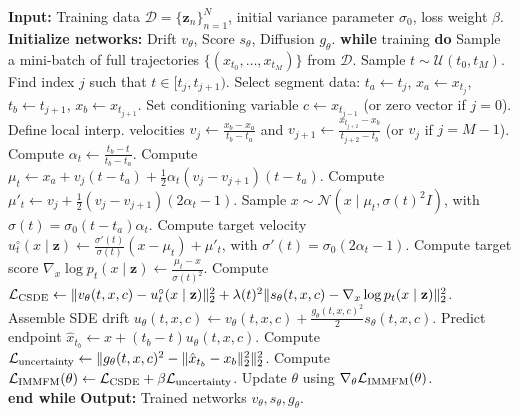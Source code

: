 \documentclass[twoside]{article}
\begin{document}
\begin{algorithm}[h]
\caption{IMMFM Training}
\label{alg:immfm_training}
\begin{algorithmic}[1]
\State \textbf{Input:} Training data $\mathcal{D} = \{ \mathbf{z}_n \}_{n=1}^N$, initial variance parameter $\sigma_0$, loss weight $\beta$.
\State \textbf{Initialize networks:} Drift $v_{\theta}$, Score $s_{\theta}$, Diffusion $g_{\theta}$.
\State \textbf{while} training \textbf{do}
\State Sample a mini-batch of full trajectories $\{ (x_{t_0}, \ldots, x_{t_M}) \}$ from $\mathcal{D}$.
\State Sample $t \sim \mathcal{U}(t_0, t_M)$.
\State Find index $j$ such that $t \in [t_j, t_{j+1})$.
\State Select segment data: $t_a \leftarrow t_j$, $x_a \leftarrow x_{t_j}$, $t_b \leftarrow t_{j+1}$, $x_b \leftarrow x_{t_{j+1}}$.
\State Set conditioning variable $c \leftarrow x_{t_{j-1}}$ (or zero vector if $j=0$).
\State Define local interp. velocities $v_j \leftarrow \frac{x_b - x_a}{t_b - t_a}$ and $v_{j+1} \leftarrow \frac{x_{t_{j+2}} - x_b}{t_{j+2} - t_b}$ (or $v_j$ if $j=M-1$).
\State Compute $\alpha_t \leftarrow \frac{t_b - t}{t_b - t_a}$.
\State Compute $\mu_t \leftarrow x_a + v_j (t - t_a) + \frac{1}{2}\alpha_t (v_j - v_{j+1})(t - t_a)$.
\State Compute $\mu'_t \leftarrow v_j + \frac{1}{2}(v_j - v_{j+1})(2\alpha_t - 1)$.
\State Sample $x \sim \mathcal{N}(x \mid \mu_t, \sigma(t)^2 I)$, with $\sigma(t) = \sigma_0 (t-t_a)\alpha_t$.
\State Compute target velocity $u^\circ_t(x \mid \mathbf{z}) \leftarrow \frac{\sigma'(t)}{\sigma(t)}(x - \mu_t) + \mu'_t$, with $\sigma'(t) = \sigma_0(2\alpha_t-1)$.
\State Compute target score $\nabla_x \log p_t(x \mid \mathbf{z}) \leftarrow \frac{\mu_t - x}{\sigma(t)^2}$.
\State Compute $\mathcal{L}_{\rm CSDE} \leftarrow \| v_{\theta}(t,x,c) - u^\circ_t(x \mid \mathbf{z}) \|_2^2 + \lambda(t)^2 \| s_{\theta}(t,x,c) - \nabla_x \log p_t(x \mid \mathbf{z}) \|_2^2$.
\State Assemble SDE drift $u_{\theta}(t,x,c) \leftarrow v_{\theta}(t,x,c) + \frac{g_{\theta}(t,x,c)^2}{2} s_{\theta}(t,x,c)$.
\State Predict endpoint $\hat{x}_{t_{b}} \leftarrow x + (t_b - t) u_{\theta}(t,x,c)$.
\State Compute $\mathcal{L}_{\rm uncertainty} \leftarrow \| g_{\theta}(t,x,c)^2 - \| \hat{x}_{t_{b}} - x_b \|_2^2 \|_2^2$.
\State Compute $\mathcal{L}_{\rm IMMFM}(\theta) \leftarrow \mathcal{L}_{\rm CSDE} + \beta \mathcal{L}_{\rm uncertainty}$.
\State Update $\theta$ using $\nabla_{\theta} \mathcal{L}_{\rm IMMFM}(\theta)$.
\EndFor\\
\textbf{end while}
\State \textbf{Output:} Trained networks $v_{\theta}, s_{\theta}, g_{\theta}$.
\end{algorithmic}
\end{algorithm}
\end{document}
